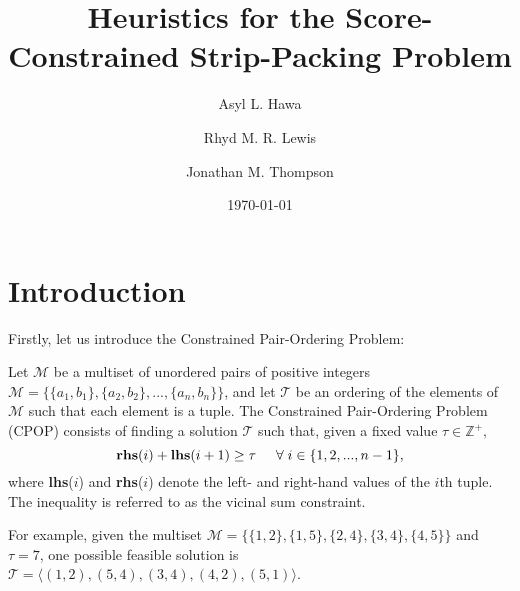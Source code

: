 \documentclass[oribibl]{llncs}
\begin{document}
\title{Heuristics for the Score-Constrained Strip-Packing Problem}
\author{Asyl L. Hawa \and Rhyd M. R. Lewis \and Jonathan M. Thompson}
\date{\today}

\maketitle

\begin{abstract}
	
\end{abstract}

\section{Introduction}
\label{sec:intro}

Firstly, let us introduce the Constrained Pair-Ordering Problem:

\begin{definition}
	\label{defn:cpop}
	Let $\mathcal{M}$ be a multiset of unordered pairs of positive integers $\mathcal{M} = \{\{a_1, b_1\}, \{a_2,b_2\},...,\{a_n,b_n\}\}$, and let $\mathcal{T}$ be an ordering of the elements of $\mathcal{M}$ such that each element is a tuple. The Constrained Pair-Ordering Problem (CPOP) consists of finding a solution $\mathcal{T}$ such that, given a fixed value $\tau \in \mathbb{Z}^{+},$
	\begin{equation}
		\label{eqn:cpop}
		\textup{\textbf{rhs}}(i) + \textup{\textbf{lhs}}(i+1) \geq \tau \hspace{5mm} \forall \hspace{1mm} i \in \{1,2,..., n-1\},
	\end{equation}
	where \textup{\textbf{lhs}($i$)} and \textup{\textbf{rhs}($i$)} denote the left- and right-hand values of the $i$th tuple. The inequality is referred to as the \textup{vicinal sum constraint}.
\end{definition}

For example, given the multiset $\mathcal{M} = \{\{1,2\}, \{1,5\}, \{2,4\}, \{3,4\}, \{4,5\}\}$ and $\tau = 7$, one possible feasible solution is $\mathcal{T} = \langle(1,2), (5,4), (3,4), (4,2), (5,1) \rangle$.
\end{document}

